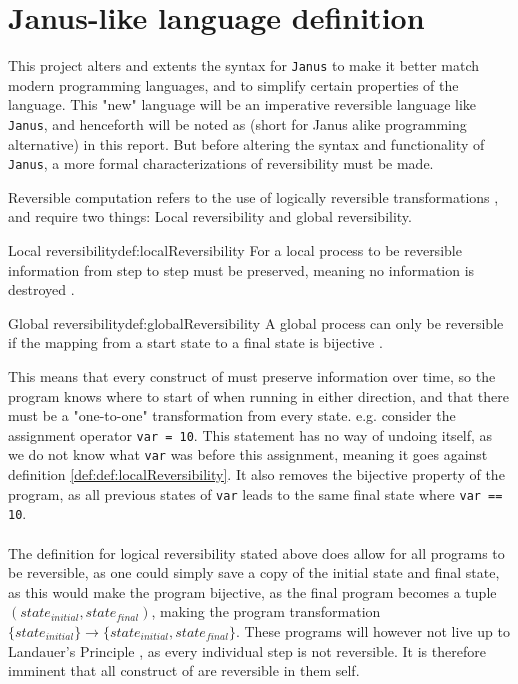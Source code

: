 \section{Janus-like language definition \rr} \label{sec:language-def}
This project alters and extents the syntax for \texttt{Janus} to make it better match modern
programming languages, and to simplify certain properties of the language.
This "new" language will be an imperative reversible language like
\texttt{Janus}, and henceforth will be noted as \lan
(short for Janus alike programming alternative) in this report.
But before altering the syntax and functionality of \texttt{Janus}, a more formal characterizations
of reversibility must be made.

Reversible computation refers to the use of logically reversible transformations \cite{ARTICLE:2},
and require two things: Local reversibility and global reversibility.

\begin{myDefinition}{Local reversibility}{def:localReversibility}
For a local process to be reversible information from step to step must be preserved, meaning no
information is destroyed \cite{ARTICLE:1}.
\end{myDefinition}

\begin{myDefinition}{Global reversibility}{def:globalReversibility}
A global process can only be reversible if the mapping from a start state to a final state is
bijective \cite{ARTICLE:1}. 
\end{myDefinition}
\noindent
This means that every construct of \lan must preserve information over time, so the program
knows where to start of when running in either direction, and that there must be a "one-to-one"
transformation from every state. e.g. consider the assignment operator \texttt{var = 10}. This
statement has no way of undoing itself, as we do not know what \texttt{var} was before this
assignment, meaning it goes against definition \ref{def:def:localReversibility}. It also removes
the bijective property of the program, as all previous states of \texttt{var} leads to the same
final state where \texttt{var == 10}.
\\
\\
The definition for logical reversibility stated above does allow for all programs to be reversible,
as one could simply save a copy of the initial state and final state, as this would make
the program bijective, as the final program becomes a tuple $(state_{initial}, state_{final})$,
making the program transformation $\{state_{initial}\} \to \{state_{initial}, state_{final}\}$.
These programs will however not live up to Landauer's Principle \cite{article:3}, as every
individual step is not reversible. It is therefore imminent that all construct of \lan are
reversible in them self.

